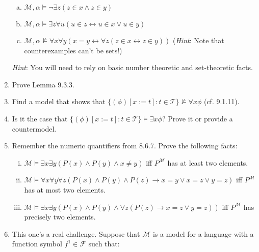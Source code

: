\begin{enumerate}[\thesection.1]
\begin{enumerate}[(a)]
			\item $\mathcal{M},\alpha\vDash\neg\exists z(z\in x\land z\in y)$			
			\item $\mathcal{M},\alpha\vDash\exists z\forall u(u\in z\leftrightarrow u\in x\lor u\in y)$
		
			\item $\mathcal{M},\alpha\nvDash \forall x\forall y(x=y\leftrightarrow \forall z(z\in x\leftrightarrow z\in y))$ (\emph{Hint}: Note that counterexamples can't be sets!)
		
		\end{enumerate}
		
		\emph{Hint}: You will need to rely on basic number theoretic and set-theoretic facts.
		
		\item Prove Lemma 9.3.3.
				
		\item Find a model that shows that $\{(\phi)[x:=t]:t\in\mathcal{T}\}\nvDash\forall x\phi$ (cf. 9.1.11).
		
		\item Is it the case that $\{(\phi)[x:=t]:t\in\mathcal{T}\}\vDash\exists x\phi$? Prove it or provide a countermodel.
		
		\item Remember the numeric quantifiers from 8.6.7. Prove the following facts:
		
		\begin{enumerate}[(i)]
		
		\item $\mathcal{M}\vDash \exists x\exists y(P(x)\land P(y)\land x\neq y)$ iff $P^\mathcal{M}$ has at least two elements.
		
		\item $\mathcal{M}\vDash \forall x\forall y\forall z(P(x)\land P(y)\land P(z)\to x=y\lor x=z\lor y=z)$ iff $P^\mathcal{M}$ has at most two elements.
		
		\item $\mathcal{M}\vDash \exists x\exists y(P(x)\land P(y)\land \forall z(P(z)\to x=z\lor y=z))$ iff $P^\mathcal{M}$ has precisely two elements.
		
		\end{enumerate}
		
		\item This one's a real challenge. Suppose that $\mathcal{M}$ is a model for a language with a function symbol $f^1\in\mathcal{F}$ such that:
		
		\begin{itemize}
		

\end{itemize}
\end{enumerate}
